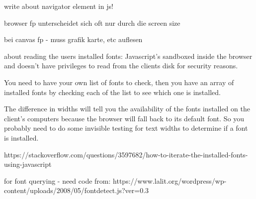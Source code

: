 write about navigator element in js!

browser fp unterscheidet sich oft nur durch die screen size

bei canvas fp - muss grafik karte, etc auflesen


about reading the users installed fonts:
Javascript's sandboxed inside the browser and doesn't have privileges to read from the clients disk for security reasons.

You need to have your own list of fonts to check, then you have an array of installed fonts by checking each of the list to see which one is installed.

The difference in widths will tell you the availability of the fonts installed on the client's computers because the browser will fall back to its default font. So you probably need to do some invisible testing for text widths to determine if a font is installed.

https://stackoverflow.com/questions/3597682/how-to-iterate-the-installed-fonts-using-javascript


for font querying - need code from:
https://www.lalit.org/wordpress/wp-content/uploads/2008/05/fontdetect.js?ver=0.3

